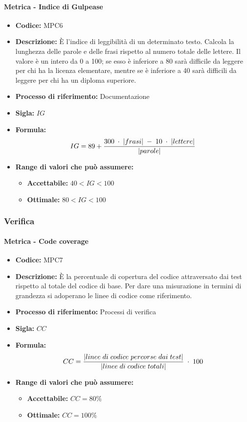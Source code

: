     \paragraph{Metrica - Indice di Gulpease}
    \begin{itemize}
        \item \textbf{Codice:} MPC6
        \item \textbf{Descrizione:} È l'indice di leggibilità di un determinato testo. Calcola la lunghezza delle parole e delle frasi rispetto al numero totale delle lettere. Il valore è un intero da 0 a 100; se esso è inferiore a 80 sarà difficile da leggere per chi ha la licenza elementare, mentre se è inferiore a 40 sarà difficili da leggere per chi ha un diploma superiore.
        \item \textbf{Processo di riferimento:} Documentazione
        \item \textbf{Sigla:} $IG$
        \item \textbf{Formula:} $$IG = 89 + {{300 \; \cdot \; |frasi| \; - \; 10 \; \cdot \; |lettere|}\over |parole|}$$
        \item \textbf{Range di valori che può assumere:}
        \begin{itemize}
            \item \textbf{Accettabile:} $40 < IG < 100$
            \item \textbf{Ottimale:} $80 < IG < 100$
        \end{itemize}
    \end{itemize}

\subsubsection{Verifica}
    \paragraph{Metrica - Code coverage}
    \begin{itemize}
        \item \textbf{Codice:} MPC7
        \item \textbf{Descrizione:} È la percentuale di copertura del codice attraversato dai test rispetto al totale del codice di base. Per dare una misurazione in termini di grandezza si adoperano le linee di codice come riferimento.
        \item \textbf{Processo di riferimento:} Processi di verifica
        \item \textbf{Sigla:} $CC$
        \item \textbf{Formula:} $$CC = {|linee \; di \; codice \; percorse \; dai  \; test| \over |linee \; di \; codice \; totali|} \; \cdot \; 100$$
        \item \textbf{Range di valori che può assumere:}
        \begin{itemize}
            \item \textbf{Accettabile:} $CC = 80\%$
            \item \textbf{Ottimale:} $CC = 100\%$
        \end{itemize}
    \end{itemize}

